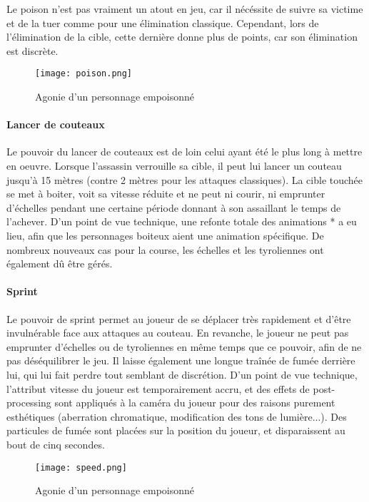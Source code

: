 			Le poison n'est pas vraiment un atout en jeu, car il nécéssite de suivre sa victime et de la tuer comme pour une 
			élimination classique. Cependant, lors de l'élimination de la cible, cette dernière donne plus de points, car son 
			élimination est discrète.
			
			\begin{figure}[hbt!]
				\centering
				\texttt{[image: poison.png]}
				\caption{Agonie d'un personnage empoisonné}
			\end{figure}
			\FloatBarrier

		
		\paragraph{Lancer de couteaux}

			Le pouvoir du lancer de couteaux est de loin celui ayant été le plus long à mettre en oeuvre. Lorsque l'assassin 
			verrouille sa cible, il peut lui lancer un couteau jusqu'à 15 mètres (contre 2 mètres pour les attaques classiques).
			La cible touchée se met à boiter, voit sa vitesse réduite et ne peut ni courir, ni emprunter d'échelles pendant une certaine 
			période donnant à son assaillant le temps de l'achever. D'un point de vue technique, une refonte totale des animations *
			a eu lieu, afin que les personnages boiteux aient une animation spécifique. De nombreux nouveaux cas pour la course, les 
			échelles et les tyroliennes ont également dû être gérés. 


		\paragraph{Sprint}
	
			Le pouvoir de sprint permet au joueur de se déplacer très rapidement et d'être invulnérable face aux attaques 
			au couteau. En revanche, le joueur ne peut pas emprunter d'échelles ou de tyroliennes en même temps que ce pouvoir, afin 
			de ne pas déséquilibrer le jeu. Il laisse également une longue traînée de fumée derrière lui, qui lui fait perdre 
			tout semblant de discrétion. D'un point de vue technique, l'attribut vitesse du joueur est temporairement accru, 
			et des effets de post-processing sont appliqués à la caméra du joueur pour des raisons purement esthétiques (aberration 
			chromatique, modification des tons de lumière...). Des particules de fumée sont placées sur la position du joueur, et 
			disparaissent au bout de cinq secondes.

			\begin{figure}[hbt!]
				\centering
				\texttt{[image: speed.png]}
				\caption{Agonie d'un personnage empoisonné}
			\end{figure}
			\FloatBarrier

